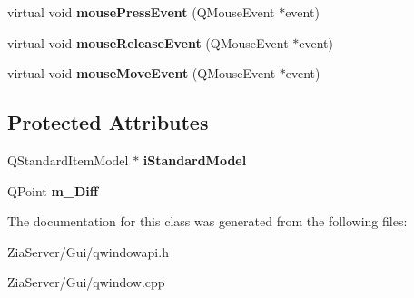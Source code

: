 \begin{DoxyCompactItemize}
\item 
\hypertarget{class_q_window_a_p_i_a9b0dee3c3c4c75b5a48c6a8d7e78b269}{
virtual void {\bfseries mousePressEvent} (QMouseEvent $\ast$event)}
\label{class_q_window_a_p_i_a9b0dee3c3c4c75b5a48c6a8d7e78b269}

\item 
\hypertarget{class_q_window_a_p_i_a158948ba8f512fa23f88ac10c97f9e06}{
virtual void {\bfseries mouseReleaseEvent} (QMouseEvent $\ast$event)}
\label{class_q_window_a_p_i_a158948ba8f512fa23f88ac10c97f9e06}

\item 
\hypertarget{class_q_window_a_p_i_a3bb8dbfeb69f26147e5990f66151692e}{
virtual void {\bfseries mouseMoveEvent} (QMouseEvent $\ast$event)}
\label{class_q_window_a_p_i_a3bb8dbfeb69f26147e5990f66151692e}

\end{DoxyCompactItemize}
\subsection*{Protected Attributes}
\begin{DoxyCompactItemize}
\item 
\hypertarget{class_q_window_a_p_i_ac510ee00f76bc4721d58f12f8a53d8f3}{
QStandardItemModel $\ast$ {\bfseries iStandardModel}}
\label{class_q_window_a_p_i_ac510ee00f76bc4721d58f12f8a53d8f3}

\item 
\hypertarget{class_q_window_a_p_i_a30c1d4ae0e9d24418026e0a553290fbb}{
QPoint {\bfseries m\_\-Diff}}
\label{class_q_window_a_p_i_a30c1d4ae0e9d24418026e0a553290fbb}

\end{DoxyCompactItemize}


The documentation for this class was generated from the following files:\begin{DoxyCompactItemize}
\item 
ZiaServer/Gui/qwindowapi.h\item 
ZiaServer/Gui/qwindow.cpp\end{DoxyCompactItemize}
